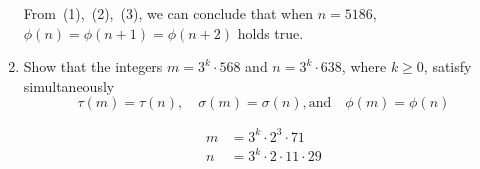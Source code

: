 \documentclass[12pt]{exam}
\theoremstyle{definition}
\begin{document}
\begin{enumerate}
\begin{answer}
              From~(1),~(2),~(3), we can conclude that when $n = 5186$, $\phi(n) = \phi(n+1) = \phi(n+2)$ holds true.

          \end{answer}


    \item Show that the integers $m = 3^k \cdot 568$ and $n = 3^k \cdot 638$, where $k \geq 0$, satisfy
          simultaneously
          \[
              \tau(m) = \tau(n),\quad \sigma(m) = \sigma(n),\text{and} \quad \phi(m) = \phi(n)
          \]
          \begin{answer}
              \[
                  \begin{aligned}
                      m & = 3^k \cdot 2^3 \cdot 71        \\
                      n & = 3^k \cdot 2 \cdot 11 \cdot 29 \\
                  \end{aligned}
              \]


\end{answer}
\end{enumerate}
\end{document}
